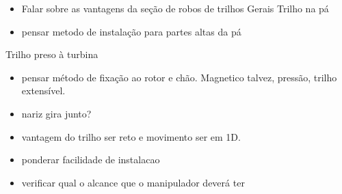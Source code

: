  \begin{itemize}
   \item Falar sobre as vantagens da seção de robos de trilhos
 Gerais	
 Trilho na pá
  \item pensar metodo de instalação para partes altas da pá
\end{itemize}

Trilho preso à turbina
\begin{itemize}
  \item pensar método de fixação ao rotor e chão. Magnetico talvez, pressão,
  trilho extensível.
  \item nariz gira junto?
  \item vantagem do trilho ser reto e movimento ser em 1D.
  \item ponderar facilidade de instalacao
  \item verificar qual o alcance que o manipulador deverá ter
  
\end{itemize}